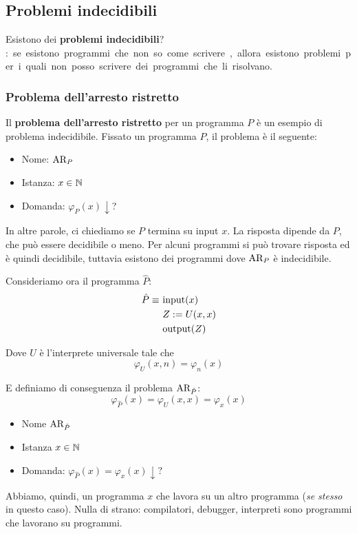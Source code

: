 \subsection{Problemi indecidibili}

Esistono dei \textbf{problemi indecidibili}? \si: se esistono programmi che non so come scrivere, allora esistono problemi per i quali non posso scrivere dei programmi che li risolvano.

\subsubsection{Problema dell'arresto ristretto}

Il \textbf{problema dell'arresto ristretto} per un programma $P$ è un esempio di problema indecidibile. Fissato un programma $P$, il problema è il seguente:
\begin{itemize}
	\item Nome: $\text{AR}_P$
	\item Istanza: $x \in \mathbb{N}$
	\item Domanda: $\varphi_P (x) \downarrow$?
\end{itemize}

In altre parole, ci chiediamo se $P$ termina su input $x$. La risposta dipende da $P$, che può essere decidibile o meno. Per alcuni programmi si può trovare risposta ed è quindi decidibile, tuttavia esistono dei programmi dove $\text{AR}_P$ è indecidibile.

Consideriamo ora il programma $\hat{P}$:
\begin{align}
	\hat{P} \equiv\ & \text{input($x$)}       \notag\\
	& Z := U(x,x)                             \notag\\
	& \text{output($Z$)}                      \notag
\end{align}

Dove $U$ è l'interprete universale tale che
$$ \varphi_U (x,n) = \varphi_n (x) $$

E definiamo di conseguenza il problema $\text{AR}_{\hat{P}}$:
$$ \varphi_{\hat{P}}(x) = \varphi_{U}(x,x) = \varphi_{x}(x) $$
\begin{itemize}
	\item Nome $\text{AR}_{\hat{P}}$
	\item Istanza $ x \in \mathbb{N}$
	\item Domanda: $\varphi_{\hat{P}}(x) = \varphi_x(x) \downarrow ?$
\end{itemize}

Abbiamo, quindi, un programma $x$ che lavora su un altro programma (\textit{se stesso} in questo caso). Nulla di strano: compilatori, debugger, interpreti sono programmi che lavorano su programmi.

